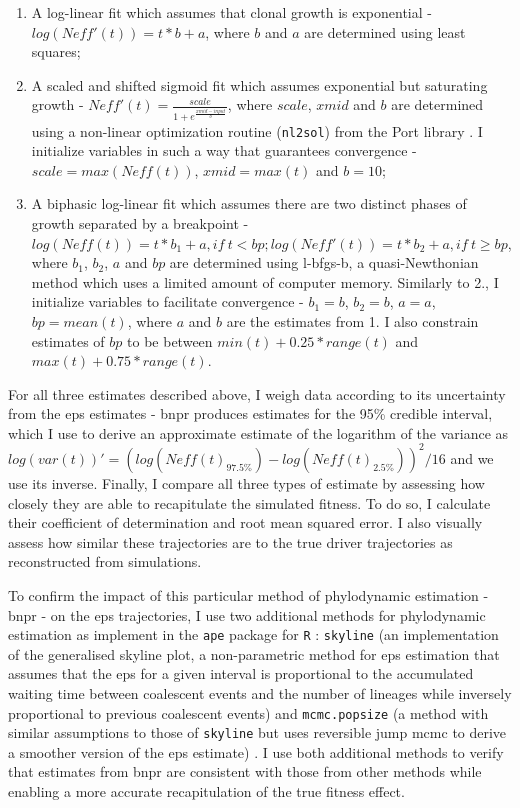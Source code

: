 \begin{enumerate}
    \item A log-linear fit which assumes that clonal growth is exponential - $log(Neff'(t)) = t * b + a$, where $b$ and $a$ are determined using least squares;
    \item A scaled and shifted sigmoid fit which assumes exponential but saturating growth - $Neff'(t) = \frac{scale}{1+e^{\frac{xmid-input}{b}}}$, where $scale$, $xmid$ and $b$ are determined using a non-linear optimization routine (\texttt{nl2sol}) from the Port library \cite{noauthor_undated-gs}. I initialize variables in such a way that guarantees convergence - $scale=max(Neff(t))$, $xmid=max(t)$ and $b=10$;
    \item A biphasic log-linear fit which assumes there are two distinct phases of growth separated by a breakpoint - $log(Neff(t)) = t * b_1 + a, if\ t < bp; log(Neff'(t)) = t * b_2 + a, if\ t \geq bp$, where $b_1$, $b_2$, $a$ and $bp$ are determined using \ac{l-bfgs-b}, a quasi-Newthonian method which uses a limited amount of computer memory. Similarly to 2., I initialize variables to facilitate convergence - $b_1=b$, $b_2=b$, $a=a$, $bp=mean(t)$, where $a$ and $b$ are the estimates from 1. I also constrain estimates of $bp$ to be between $min(t) + 0.25*range(t)$ and $max(t) + 0.75 * range(t)$.
\end{enumerate}

For all three estimates described above, I weigh data according to its uncertainty from the \ac{eps} estimates - \ac{bnpr} produces estimates for the 95\% credible interval, which I use to derive an approximate estimate of the logarithm of the variance as $log(var(t))' = (log(Neff(t)_{97.5\%}) - log(Neff(t)_{2.5\%}))^2/16$ and we use its inverse. Finally, I compare all three types of estimate by assessing how closely they are able to recapitulate the simulated fitness. To do so, I calculate their coefficient of determination and root mean squared error. I also visually assess how similar these trajectories are to the true driver trajectories as reconstructed from simulations.

To confirm the impact of this particular method of phylodynamic estimation - \ac{bnpr} - on the \ac{eps} trajectories, I use two additional methods for phylodynamic estimation as implement in the \texttt{ape} package for \texttt{R} \cite{Paradis2019-na}: \texttt{skyline} (an implementation of the generalised skyline plot, a non-parametric method for \ac{eps} estimation that assumes that the \ac{eps} for a given interval is proportional to the accumulated waiting time between coalescent events and the number of lineages while inversely proportional to previous coalescent events) and \texttt{mcmc.popsize} (a method with similar assumptions to those of \texttt{skyline} but uses reversible jump \ac{mcmc} to derive a smoother version of the \ac{eps} estimate) \cite{Opgen-Rhein2005-pi}. I use both additional methods to verify that estimates from \ac{bnpr} are consistent with those from other methods while enabling a more accurate recapitulation of the true fitness effect.


